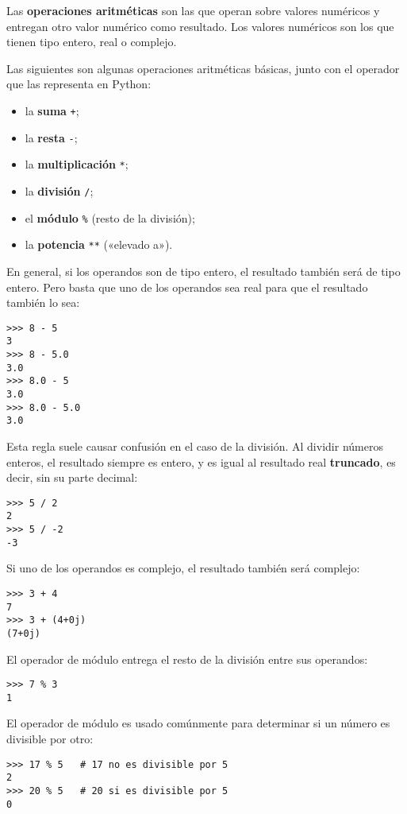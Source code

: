 Las \textbf{operaciones aritméticas} son las que operan sobre valores
numéricos y entregan otro valor numérico como resultado. Los valores
numéricos son los que tienen tipo entero, real o complejo.

Las siguientes son algunas operaciones aritméticas básicas, junto con el
operador que las representa en Python:

\begin{itemize}
\item la \textbf{suma} \lstinline!+!;
\item la \textbf{resta} \lstinline!-!;
\item la \textbf{multiplicación} \lstinline!*!;
\item la \textbf{división} \lstinline!/!;
\item el \textbf{módulo} \lstinline!%! (resto de la división);
\item la \textbf{potencia} \lstinline!**! («elevado a»).
\end{itemize}

En general, si los operandos son de tipo entero, el resultado también
será de tipo entero. Pero basta que uno de los operandos sea real para
que el resultado también lo sea:

\begin{lstlisting}
>>> 8 - 5
3
>>> 8 - 5.0
3.0
>>> 8.0 - 5
3.0
>>> 8.0 - 5.0
3.0
\end{lstlisting}

Esta regla suele causar confusión en el caso de la división. Al dividir
números enteros, el resultado siempre es entero, y es igual al resultado
real \textbf{truncado}, es decir, sin su parte decimal:

\begin{lstlisting}
>>> 5 / 2
2
>>> 5 / -2
-3
\end{lstlisting}

Si uno de los operandos es complejo, el resultado también será complejo:

\begin{lstlisting}
>>> 3 + 4
7
>>> 3 + (4+0j)
(7+0j)
\end{lstlisting}

El operador de módulo entrega el resto de la división entre sus
operandos:
\begin{lstlisting}
>>> 7 % 3
1
\end{lstlisting}
El operador de módulo es usado comúnmente para determinar
si un número es divisible por otro:
\begin{lstlisting}
>>> 17 % 5   # 17 no es divisible por 5
2
>>> 20 % 5   # 20 si es divisible por 5
0
\end{lstlisting}

